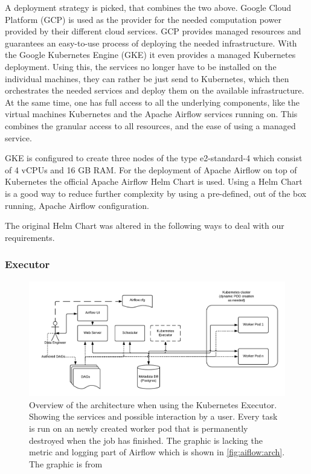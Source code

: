 \documentclass[a4paper,journal]{IEEEtran}
\begin{document}
	A deployment strategy is picked, that combines the two above. Google Cloud Platform (GCP) is used as the provider for the needed computation power provided by their different cloud services. GCP provides managed resources and guarantees an easy-to-use process of deploying the needed infrastructure. With the Google Kubernetes Engine (GKE) it even provides a managed Kubernetes deployment. Using this, the services no longer have to be installed on the individual machines, they can rather be just send to Kubernetes, which then orchestrates the needed services and deploy them on the available infrastructure. At the same time, one has full access to all the underlying components, like the virtual machines Kubernetes and the Apache Airflow services running on. This combines the granular access to all resources, and the ease of using a managed service.
	
	GKE is configured to create three nodes of the type e2-standard-4 which consist of 4 vCPUs and 16 GB RAM. \cite{gcpMachineType}
	For the deployment of Apache Airflow on top of Kubernetes the official Apache Airflow Helm Chart is used. \cite{airflowHelmChart} Using a Helm Chart is a good way to reduce further complexity by using a pre-defined, out of the box running, Apache Airflow configuration. 
	
	The original Helm Chart \cite{airflowHelmChart} was altered in the following ways to deal with our requirements.
	\subsubsection{Executor}
	
	\begin{figure}[h]
		\centering
		\includegraphics[width=0.9\linewidth]{images/arch-diag-kubernetes.png}
		\caption{Overview of the architecture when using the Kubernetes Executor. Showing the services and possible interaction by a user. Every task is run on an newly created worker pod that is permanently destroyed when the job has finished. The graphic is lacking the metric and logging part of Airflow which is shown in \autoref{fig:aiflow:arch}. The graphic is from \cite{airflowExecutorKubernetes}}
		\label{fig:airflow_arch_kubernetes}
	\end{figure}
	
\end{document}
